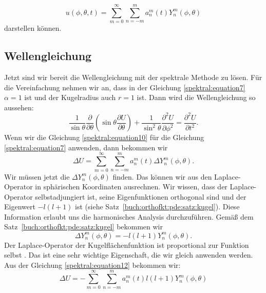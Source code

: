 \begin{equation}
u(\phi,\theta,t) = \sum_{m=0}^{\infty}\sum_{n=-m}^{m}a_n^m(t)Y_n^m(\phi, \theta)
\label{spektral:equation10}
\end{equation}
darstellen können.

\subsection{Wellengleichung
\label{spektral:subsection:wellengleichung}}
Jetzt sind wir bereit die Wellengleichung mit der spektrale Methode zu lösen.
Für die Vereinfachung nehmen wir an, dass in der Gleichung \eqref{spektral:equation7} $\alpha=1$ ist und der Kugelradius auch $r=1$ ist.
Dann wird die Wellengleichung so aussehen:
\begin{equation}
\frac{1}{\sin\theta}\frac{\partial}{\partial{\theta}}\left(\sin\theta\frac{\partial{U}}{\partial{\theta}}\right) + \frac{1}{\sin^2\theta}\frac{\partial^2{U}}{\partial{\phi^2}} = \frac{\partial^2{U}}{\partial{t^2}}.
\label{spektral:equation11}
\end{equation}
Wenn wir die Gleichung \eqref{spektral:equation10} für die Gleichung \eqref{spektral:equation7} anwenden, dann bekommen wir
\begin{equation}
\Delta{U} = \sum_{m=0}^{\infty}\sum_{n=-m}^{m}a_n^m(t)\Delta{Y_n^m(\phi, \theta)}.
\label{spektral:equation12}
\end{equation}
Wir müssen jetzt die $\Delta{Y_n^m(\phi, \theta)}$ finden.
Das können wir aus den Laplace-Operator in sphärischen Koordinaten ausrechnen. Wir wissen, dass der Laplace-Operator selbstadjungiert ist, seine Eigenfunktionen orthogonal sind und der Eigenwert $-l(l+1)$ ist (siehe Satz~\ref{buch:orthofkt:pde:satz:kugel}).
Diese Information erlaubt uns die harmonisches Analysis durchzuführen.
Gemäß dem Satz~\ref{buch:orthofkt:pde:satz:kugel} bekommen wir
\begin{equation}
\Delta{Y_n^m(\phi, \theta)} = -l(l+1)Y_n^m(\phi, \theta).
\label{spektral:equation16}
\end{equation}
Der Laplace-Operator der Kugelflächenfunktion ist proportional zur Funktion selbst \cite[Seite 663]{spektral:DynamicOfTheAtmosphere}.
Das ist eine sehr wichtige Eigenschaft, die wir gleich anwenden werden.
Aus der Gleichung \eqref{spektral:equation12} bekommen wir:
\begin{equation}
\Delta{U} = -\sum_{m=0}^{\infty}\sum_{n=-m}^{m}a_n^m(t)l(l+1)Y_n^m(\phi, \theta)
\label{spektral:equation17}
\end{equation}
